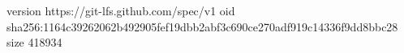 version https://git-lfs.github.com/spec/v1
oid sha256:1164c39262062b492905fef19dbb2abf3c690ce270adf919c14336f9dd8bbc28
size 418934
